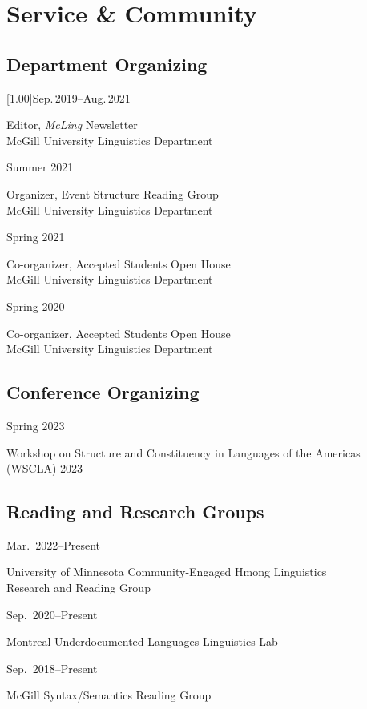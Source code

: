 \documentclass[11pt,oneside,DIV=8,parskip=off,letterpaper]{scrarticle} %
\newlength{\leftcolwidth}
\newlength{\mycolspace}
\newlength{\rightcolwidth}
\newlength{\spacingbefore}
\newlength{\spacingafter}
\newcommand{\mytwocol}[2]{%
	\vspace{\spacingbefore}%
	\begin{minipage}[t]{\leftcolwidth}%
		\strut#1%
	\end{minipage}%
	\hspace{\mycolspace}%
	\begin{minipage}[t]{\rightcolwidth}%
		\strut#2%
	\end{minipage}%
	\vspace{\spacingafter}\par%
	}
\newcommand{\cvline}[2]{%
	\mytwocol{#1}{#2}%
	}
\begin{document}

\section{Service \& Community}

\subsection{Department Organizing}
\cvline{\scalebox{.97}[1.00]{Sep.\,2019--Aug.\,2021}}{Editor, \textit{McLing} Newsletter\\McGill University Linguistics Department}

\cvline{Summer 2021}{Organizer, Event Structure Reading Group\\McGill University Linguistics Department}

\cvline{Spring 2021}{Co-organizer, Accepted Students Open House\\McGill University Linguistics Department}

\cvline{Spring 2020}{Co-organizer, Accepted Students Open House\\McGill University Linguistics Department}

\subsection{Conference Organizing}
\cvline{Spring 2023}{Workshop on Structure and Constituency in Languages of the Americas (WSCLA) 2023}

\subsection{Reading and Research Groups}

\cvline{Mar.\ 2022--Present}{University of Minnesota Community-Engaged Hmong Linguistics\\Research and Reading Group}

\cvline{Sep.\ 2020--Present}{Montreal Underdocumented Languages Linguistics Lab}

\cvline{Sep.\ 2018--Present}{McGill Syntax/Semantics Reading Group}
\end{document}
